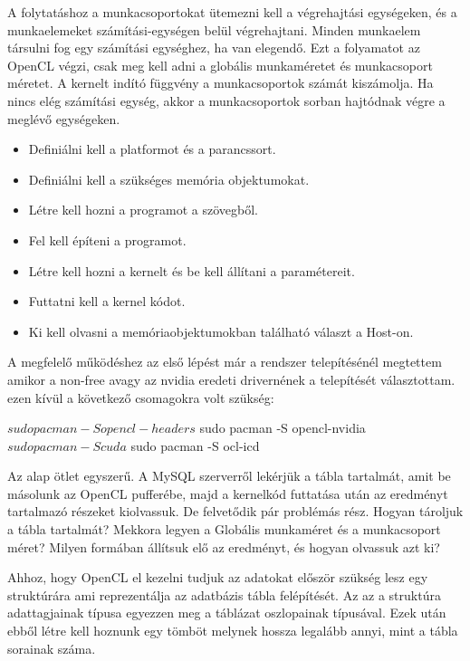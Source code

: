 A folytatáshoz a munkacsoportokat ütemezni kell a végrehajtási egységeken, és a munkaelemeket számítási-egységen belül végrehajtani.
Minden munkaelem társulni fog egy számítási egységhez, ha van elegendő. Ezt a folyamatot az OpenCL végzi, csak meg kell adni a globális munkaméretet és munkacsoport méretet. A kernelt indító függvény a  munkacsoportok számát kiszámolja. Ha nincs elég számítási egység, akkor a munkacsoportok sorban hajtódnak végre a meglévő egységeken.

\begin{itemize}
\item Definiálni kell a platformot és a parancssort.
\item Definiálni kell a szükséges memória objektumokat.
\item Létre kell hozni a programot a szövegből.
\item Fel kell építeni a programot.
\item Létre kell hozni a kernelt és be kell állítani a paramétereit.
\item Futtatni kell a kernel kódot.
\item Ki kell olvasni a memóriaobjektumokban található választ a Host-on.

\end{itemize}



A megfelelő működéshez az első lépést már a rendszer telepítésénél megtettem amikor a non-free avagy az nvidia eredeti drivernének a telepítését választottam.
ezen kívül a következő csomagokra volt szükség: 

\begin{python}
$ sudo pacman -S opencl-headers
$ sudo pacman -S opencl-nvidia
$ sudo pacman -S cuda
$ sudo pacman -S ocl-icd
\end{python}


Az alap ötlet egyszerű. A MySQL szerverről lekérjük a tábla tartalmát, amit be másolunk az OpenCL pufferébe, majd a kernelkód futtatása után az eredményt tartalmazó részeket kiolvassuk. De felvetődik pár problémás rész. Hogyan tároljuk a tábla tartalmát? Mekkora legyen a Globális munkaméret és a munkacsoport méret? Milyen formában állítsuk elő az eredményt, és hogyan olvassuk azt ki?

Ahhoz, hogy OpenCL el kezelni tudjuk az adatokat először szükség lesz egy struktúrára ami reprezentálja az adatbázis tábla felépítését. Az az a struktúra adattagjainak típusa egyezzen meg a táblázat oszlopainak típusával. Ezek után ebből létre kell hoznunk egy tömböt melynek hossza legalább annyi, mint a tábla sorainak száma.

